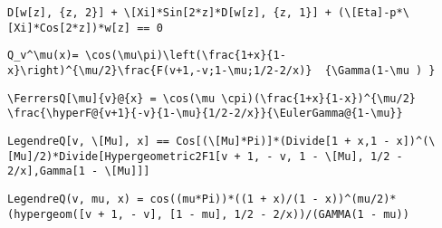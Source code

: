 \newsavebox\DOMM
\begin{lrbox}{\DOMM}
 \begin{minipage}[t]{0.82\textwidth}
  \lstinline[language={[latex]TeX},mathescape,breaklines=true]"D[w[z], {z, 2}] + \[Xi]*Sin[2*z]*D[w[z], {z, 1}] + (\[Eta]-p*\[Xi]*Cos[2*z])*w[z] == 0"
 \end{minipage}
\end{lrbox}
\newsavebox\DOMA
\begin{lrbox}{\DOMA}
 \begin{minipage}[t]{0.82\textwidth}
  \lstinline[language={[latex]TeX},mathescape,breaklines=true]""
 \end{minipage}
\end{lrbox}
\newsavebox\DPT
\begin{lrbox}{\DPT}
 \begin{minipage}[t]{0.82\textwidth}
  \lstinline[language={[latex]TeX},mathescape,breaklines=true]"Q_v^\mu(x)= \cos(\mu\pi)\left(\frac{1+x}{1-x}\right)^{\mu/2}\frac{F(v+1,-v;1-\mu;1/2-2/x)}  {\Gamma(1-\mu ) }"
 \end{minipage}
\end{lrbox}
\newsavebox\DPST
\begin{lrbox}{\DPST}
 \begin{minipage}[t]{0.82\textwidth}
  \lstinline[language={[latex]TeX},mathescape,breaklines=true]"\FerrersQ[\mu]{v}@{x} = \cos(\mu \cpi)(\frac{1+x}{1-x})^{\mu/2} \frac{\hyperF@{v+1}{-v}{1-\mu}{1/2-2/x}}{\EulerGamma@{1-\mu}}"
 \end{minipage}
\end{lrbox}
\newsavebox\DPMM
\begin{lrbox}{\DPMM}
 \begin{minipage}[t]{0.82\textwidth}
  \lstinline[language={[latex]TeX},mathescape,breaklines=true]"LegendreQ[v, \[Mu], x] == Cos[(\[Mu]*Pi)]*(Divide[1 + x,1 - x])^(\[Mu]/2)*Divide[Hypergeometric2F1[v + 1, - v, 1 - \[Mu], 1/2 - 2/x],Gamma[1 - \[Mu]]]"
 \end{minipage}
\end{lrbox}
\newsavebox\DPMA
\begin{lrbox}{\DPMA}
 \begin{minipage}[t]{0.82\textwidth}
  \lstinline[language={[latex]TeX},mathescape,breaklines=true]"LegendreQ(v, mu, x) = cos((mu*Pi))*((1 + x)/(1 - x))^(mu/2)*(hypergeom([v + 1, - v], [1 - mu], 1/2 - 2/x))/(GAMMA(1 - mu))"
 \end{minipage}
\end{lrbox}
